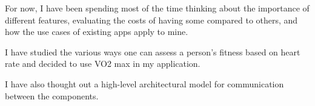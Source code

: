 \linebreak
For now, I have been spending most of the time thinking about the importance of different features, evaluating the costs of having some compared to others, and how the use cases of existing apps apply to mine.

I have studied the various ways one can assess a person's fitness based on heart rate and decided to use VO2 max in my application.

I have also thought out a high-level architectural model for communication between the components.